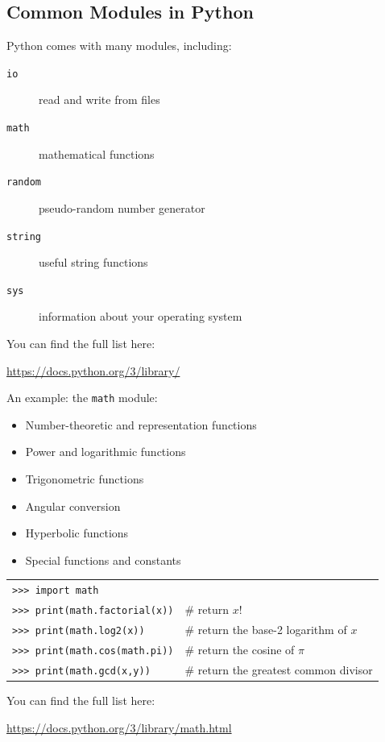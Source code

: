 \documentclass[t,handout,9pt]{beamer}
\begin{document}
\subsection{Common Modules in Python}
\begin{frame}
Python comes with many modules, including:
\vfill
\begin{description}
	\item[\texttt{io}] read and write from files
	\item[\texttt{math}] mathematical functions
	\item[\texttt{random}] pseudo-random number generator
	\item[\texttt{string}] useful string functions
	\item[\texttt{sys}] information about your operating system
\end{description}
\vfill
You can find the full list here:
\begin{center}
	\url{https://docs.python.org/3/library/}
\end{center}
\vfill
\end{frame}
%
\begin{frame}
An example: the \texttt{math} module:
\begin{itemize}
	\item Number-theoretic and representation functions
	\item Power and logarithmic functions
	\item Trigonometric functions
	\item Angular conversion
	\item Hyperbolic functions
	\item Special functions and constants
\end{itemize}
\begin{table}[]
\begin{flushleft}
\begin{tabular}{ll}
\texttt{>{}>{}> import math}        & \\
\texttt{>{}>{}> print(math.factorial(x))}        & \# return $x!$\\
\texttt{>{}>{}> print(math.log2(x))}        & \# return the base-2 logarithm of $x$\\
\texttt{>{}>{}> print(math.cos(math.pi))}        & \# return the cosine of $\pi$\\
\texttt{>{}>{}> print(math.gcd(x,y))}        & \# return the greatest common divisor\\
\end{tabular}
\end{flushleft}
\end{table}
\vfill
You can find the full list here:
\begin{center}
	\url{https://docs.python.org/3/library/math.html}
\end{center}
\vfill
\end{frame}
%
\end{document}
